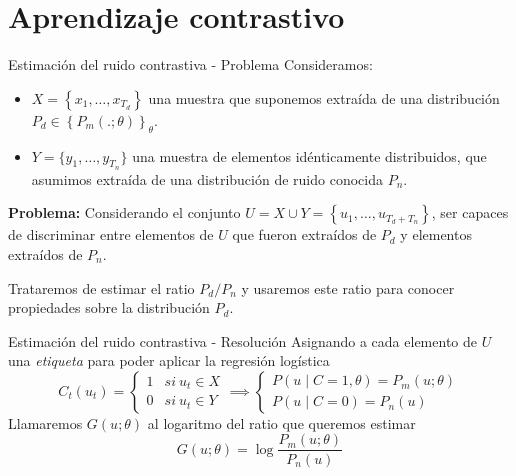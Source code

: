 \documentclass[aspectratio=169]{beamer}
\begin{document}
  \section{Aprendizaje contrastivo}

  \begin{frame}{Estimación del ruido contrastiva - Problema}
    Consideramos: 
    \begin{itemize}
      \item \( X = \left\{x_1,\dots,x_{T_d}\right\}\) una muestra que suponemos extraída de una distribución \( P_d \in \left\{P_m(.;\theta)\right\}_\theta \).
      \item \( Y = \{ y_1,\dots,y_{T_n}\}\) una muestra de elementos idénticamente distribuidos, que asumimos extraída de una distribución de ruido conocida \( P_n\).

    \end{itemize}
    \pause
  
    \begin{shaded}
      \textbf{Problema:} Considerando el conjunto \(U = X \cup Y = \left\{u_1,\dots,u_{T_d+T_n}\right\}\), ser capaces de discriminar entre elementos de \(U\) que fueron extraídos de \(P_d\) y elementos extraídos de \(P_n\).
    \end{shaded}
    \pause
    Trataremos de estimar el ratio \(P_d/P_n\) y usaremos este ratio para conocer propiedades sobre la distribución \(P_d\).
  \end{frame}
  \begin{frame}{Estimación del ruido contrastiva - Resolución}
    Asignando a cada elemento de \(U\) una \emph{etiqueta} para poder aplicar la regresión logística
    \[
      C_t(u_t) = \begin{cases}
      1 & si \ u_t \in X\\
      0 & si \ u_t \in Y
      \end{cases} \implies \begin{cases}
        P(u\mid C = 1,\theta) = P_m(u;\theta) \\
         P(u\mid C = 0) = P_n(u)
        \end{cases}
    \]
    Llamaremos \(G(u;\theta)\) al logaritmo del ratio que queremos estimar 
    \[
      G(u;\theta) = \log \frac{P_m(u;\theta)}{P_n(u)} 
      \]
  \end{frame}
\end{document}
